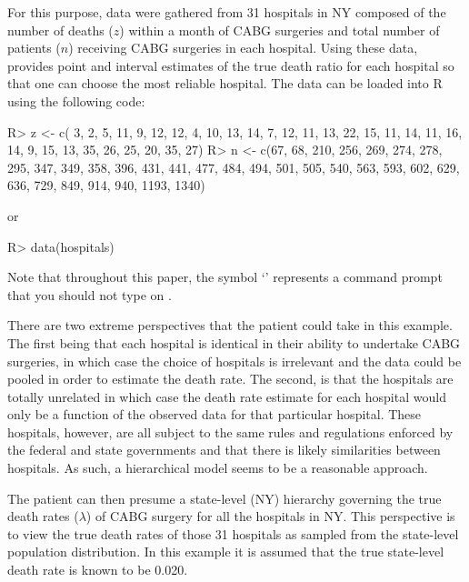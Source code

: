 \documentclass[article]{jss}
\begin{document}
For this purpose, data were gathered from 31 hospitals in NY composed of the number of deaths ($z$) within a month of CABG surgeries and total number of patients ($n$) receiving CABG surgeries in each hospital. Using these data,  provides point and interval estimates of the true death ratio for each hospital so that one can choose the most reliable hospital. The data can be loaded into R using the following code:
\begin{CodeChunk}
\begin{CodeInput}
R> z <- c( 3, 2, 5, 11, 9, 12, 12, 4, 10, 13, 14, 7, 12, 11, 13, 22, 15, 
          11, 14, 11, 16, 14, 9, 15, 13, 35, 26, 25, 20, 35, 27)
R> n <- c(67, 68, 210, 256, 269, 274, 278, 295, 347, 349, 358, 396, 431,
         441, 477, 484, 494, 501, 505, 540, 563, 593, 602, 629, 636, 729,
         849, 914, 940, 1193, 1340)
\end{CodeInput}
\end{CodeChunk}
or
\begin{CodeChunk}
\begin{CodeInput}
R> data(hospitals)
\end{CodeInput}
\end{CodeChunk}

Note that throughout this paper, the symbol `' represents a command prompt that you should not type on .

There are two extreme perspectives that the patient could take in this example. The first being that each hospital is identical in their ability to undertake CABG surgeries, in which case the choice of hospitals is irrelevant and the data could be pooled in order to estimate the death rate. The second, is that the hospitals are totally unrelated in which case the death rate estimate for each hospital would only be a function of the observed data for that particular hospital. These hospitals, however, are all subject to the same rules and regulations enforced by the federal and state governments and that there is likely similarities between hospitals. As such, a hierarchical model seems to be a reasonable approach. 


The patient can then presume a state-level (NY) hierarchy governing the true death rates ($\lambda$) of CABG surgery for all the hospitals in NY. This perspective is to view the true death rates of those 31 hospitals as sampled from the state-level population distribution. In this example it is assumed that the true state-level death rate is known to be 0.020. 
\end{document}
